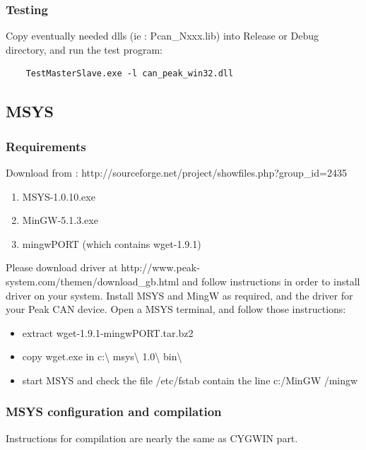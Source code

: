 \documentclass[12pt,english,a4paper]{book}
\begin{document}
\subsubsection{Testing}

Copy eventually needed dlls (ie : Pcan\_Nxxx.lib) into Release or
Debug directory, and run the test program:


\begin{verbatim}
	TestMasterSlave.exe -l can_peak_win32.dll
\end{verbatim}


\subsection{MSYS}


\subsubsection{Requirements}

Download from : http://sourceforge.net/project/showfiles.php?group\_id=2435

\begin{enumerate}
\item MSYS-1.0.10.exe 
\item MinGW-5.1.3.exe 
\item mingwPORT (which contains wget-1.9.1) 
\end{enumerate}
Please download driver at http://www.peak-system.com/themen/download\_gb.html
and follow instructions in order to install driver on your system.
Install MSYS and MingW as required, and the driver for your Peak CAN
device. Open a MSYS terminal, and follow those instructions:\\


\begin{itemize}
\item extract wget-1.9.1-mingwPORT.tar.bz2 
\item copy wget.exe in c:\textbackslash{} msys\textbackslash{} 1.0\textbackslash{}
bin\textbackslash{} 
\item start MSYS and check the file /etc/fstab contain the line c:/MinGW
/mingw 
\end{itemize}

\subsubsection{MSYS configuration and compilation}

Instructions for compilation are nearly the same as CYGWIN part.
\end{document}
